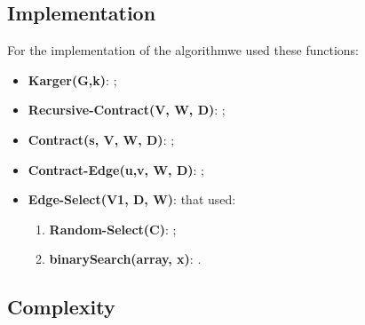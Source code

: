 \subsection{Implementation}
For the implementation of the algorithmwe used these functions:
\begin{itemize}
	\item  \textbf{Karger(G,k)}: ;
	\item  \textbf{Recursive-Contract(V, W, D)}: ;
	\item  \textbf{Contract(s, V,  W, D)}: ;
	\item  \textbf{Contract-Edge(u,v, W, D)}: ;
	\item  \textbf{Edge-Select(V1, D, W)}: that used:
	\begin{enumerate}
		\item  \textbf{Random-Select(C)}: ;
		\item  \textbf{binarySearch(array, x)}: .
	\end{enumerate}
\end{itemize}



\subsection{Complexity}



\pagebreak